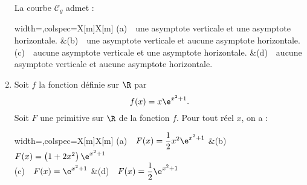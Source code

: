 \begin{enumerate}[resume]
	La courbe $\mathcal{C}_g$ admet :
	
	\smallskip
	
	\begin{tblr}{width=\linewidth,colspec={X[m]X[m]}}
		(a)~~une asymptote verticale et une asymptote horizontale. &(b)~~une asymptote verticale et aucune asymptote horizontale.\\
		(c)~~aucune asymptote verticale et une asymptote horizontale. &(d)~~aucune asymptote verticale et aucune asymptote horizontale.
	\end{tblr}
	\item Soit $f$ la fonction définie sur $\R$ par \[f(x) = x\e^{x^2+1}.\]
	Soit $F$ une primitive sur $\R$ de la fonction $f$. Pour tout réel $x$, on a :
	
	\smallskip
	
	\begin{tblr}{width=\linewidth,colspec={X[m]X[m]}}
		(a)~~$F(x) = \dfrac12x^2\e^{x^2+1}$ &(b)~~$F(x) = \left(1 + 2x^2 \right)\e^{x^2+1}$ \\
		(c)~~$F(x) = \e^{x^2+1}$ &(d)~~$F(x) = \dfrac12\e^{x^2+1}$
	\end{tblr}
\end{enumerate}